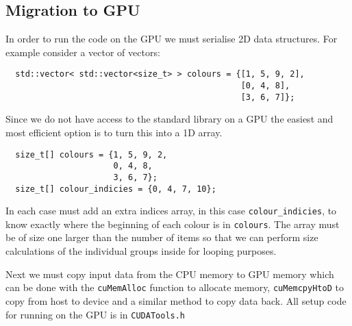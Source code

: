 \subsection{Migration to GPU}
In order to run the code on the GPU we must serialise 2D data structures. For example consider a vector of vectors:
\begin{verbatim}
  std::vector< std::vector<size_t> > colours = {[1, 5, 9, 2],
                                                [0, 4, 8],
                                                [3, 6, 7]};
\end{verbatim}
Since we do not have access to the standard library on a GPU the easiest and most efficient option is to turn this into a 1D array.
\begin{verbatim}
  size_t[] colours = {1, 5, 9, 2,
                      0, 4, 8,
                      3, 6, 7};
  size_t[] colour_indicies = {0, 4, 7, 10};
\end{verbatim}
In each case must add an extra indices array, in this case \verb!colour_indicies!, to know exactly where the beginning of each colour is in \verb!colours!. The array must be of size one larger than the number of items so that we can perform size
calculations of the individual groups inside for looping purposes.

Next we must copy input data from the CPU memory to GPU memory which can be done with the \verb!cuMemAlloc! function to allocate memory, \verb!cuMemcpyHtoD! to copy from host to device and a similar method to copy data back. All setup code for running on the GPU is in \verb!CUDATools.h!

